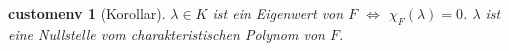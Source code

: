 \documentclass{report}
\newcommand{\lb}{\lambda}
\theoremstyle{customrem}
\theoremstyle{customdef}
\theoremstyle{customenv}
\newtheorem*{customenv}{customenv} %
\begin{document}
	\begin{customenv}[Korollar]
		\(\lb\in K\) ist ein Eigenwert von \(F\) \(\iff\) \(\chi_F(\lb) = 0\). \(\lb\) ist eine Nullstelle vom charakteristischen Polynom von \(F\).\linebreak
	\end{customenv}


\newpage
\renewcommand{\listtheoremname}{Satz- und Definitionsverzeichnis}
\listoftheorems[ignoreall, show={definition}, show={satz}, show={lemma}, show={definitionn}, show={korrolar}, show={altdefinition}]
\newpage
\printindex
\end{document}
